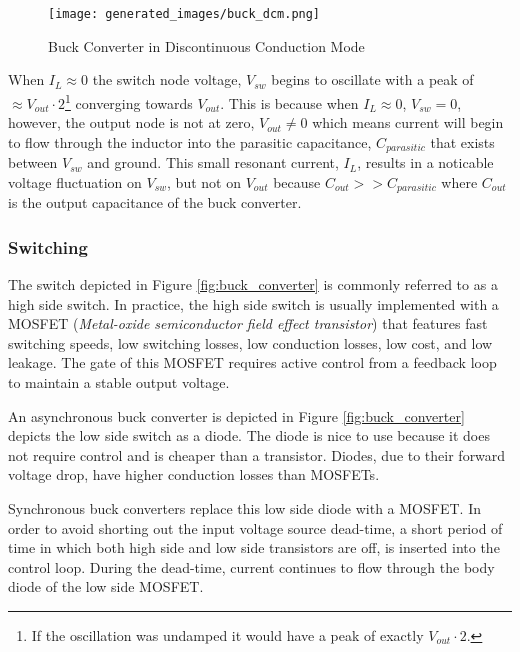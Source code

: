 \documentclass[main.tex]{subfiles}
\begin{document}
\begin{figure}[H]
    \centering
    \texttt{[image: generated\_images/buck\_dcm.png]}
    \caption{Buck Converter in Discontinuous Conduction Mode}
    \label{fig:buck-dcm}
\end{figure}

\noindent When $I_L \approx 0$ the switch node voltage, $V_{sw}$ begins to oscillate with a peak of $\approx V_{out} \cdot 2$\footnote{If the oscillation was undamped it would have a peak of exactly $V_{out} \cdot 2$.} converging towards $V_{out}$. This is because when $I_L \approx 0$, $V_{sw} = 0$, however, the output node is not at zero, $V_{out} \neq 0$ which means current will begin to flow through the inductor into the parasitic capacitance, $C_{parasitic}$ that exists between $V_{sw}$ and ground. This small resonant current, $I_L$, results in a noticable voltage fluctuation on $V_{sw}$, but not on $V_{out}$ because $C_{out} >> C_{parasitic}$ where $C_{out}$ is the output capacitance of the buck converter. 

\subsubsection{Switching}
The switch depicted in Figure \ref{fig:buck_converter} is commonly referred to as a high side switch. In practice, the high side switch is usually implemented with a MOSFET (\textit{Metal-oxide semiconductor field effect transistor}) that features fast switching speeds, low switching losses, low conduction losses, low cost, and low leakage. The gate of this MOSFET requires active control from a feedback loop to maintain a stable output voltage. \newline

\newnoindentpara An asynchronous buck converter is depicted in Figure \ref{fig:buck_converter} depicts the low side switch as a diode. The diode is nice to use because it does not require control and is cheaper than a transistor. Diodes, due to their forward voltage drop, have higher conduction losses than MOSFETs. \newline

\newnoindentpara Synchronous buck converters replace this low side diode with a MOSFET. In order to avoid shorting out the input voltage source dead-time, a short period of time in which both high side and low side transistors are off, is inserted into the control loop. During the dead-time, current continues to flow through the body diode of the low side MOSFET. 
\end{document}
